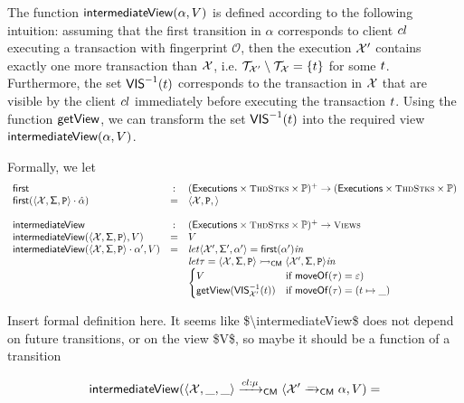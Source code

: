 The function $\mathsf{intermediateView}(\alpha, V)$ is defined according 
to the following intuition: assuming that the first transition in 
$\alpha$ corresponds to client $cl$ executing a transaction 
with fingerprint $\mathcal{O}$, then the execution $\mathcal{X}'$ 
contains exactly one more transaction than $\mathcal{X}$, i.e. 
$\mathcal{T}_{\mathcal{X}'} \setminus \mathcal{T}_{\mathcal{X}} = \{t\}$ for some $t$. 
Furthermore, the set ${\mathsf{VIS}}^{-1}(t)$ corresponds to the 
transaction in $\mathcal{X}$ that are visible by the client 
$cl$ immediately before executing the transaction $t$. 
Using the function $\mathsf{getView}$, we can transform the set 
${\mathsf{VIS}}^{-1}(t)$ into the required view $\mathsf{intermediateView}(\alpha, V)$. 

Formally, we let 
\[
\begin{array}{lcl}
\first&:& (\aeset \times \ThdStacks \times \progset)^{+} \rightarrow (\aeset \times \ThdStacks \times \progset)\\
\first(\langle \aexec, \thdstackFun, \prog \rangle \cdot \hat{\alpha}) &=& \langle \aexec, \prog, \rangle\\
&&\\
\intermediateView&:& (\aeset \times \ThdStacks \times \progset)^{+} \rightarrow \Views\\
\intermediateView(\langle \aexec, \thdstackFun, \prog \rangle, V) &=& V \\ 
\intermediateView(\langle \aexec, \thdstackFun, \prog \rangle \cdot \alpha', V) &=& 
\mathit{let } \langle \aexec', \thdstackFun', \alpha' \rangle = \first(\alpha') \mathit{ in } \\
&& \mathit{let } \tau = \langle \aexec, \thdstackFun, \prog \rangle \absrightarrow_{\CM} \langle \aexec', \thdstackFun, \prog \rangle \mathit{ in } \\
&&%
\begin{cases}
V & \text{if } \transmove(\tau) = \varepsilon)\\
\getView(\VIS_{\aexec'}^{-1}(\tsid)) & \text{if } \transmove(\tau) = (\tsid \mapsto \_)
\end{cases}
\end{array}
\]

\ac{Insert formal definition here. It seems like $\intermediateView$ does 
not depend on future transitions, or on the view $V$, 
so maybe it should be a function of a transition}

\begin{definition}
\[
\mathsf{intermediateView}( \langle \mathcal{X}, \_, \_ \rangle \xrightarrow{cl: \mu}_{\mathsf{CM}} \langle \mathcal{X}' \xrightarrow{\_}_{\mathsf{CM}} \alpha, V) = 
\]
\end{definition}




